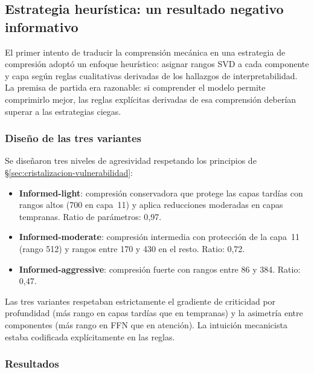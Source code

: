 \subsection{Estrategia heurística: un resultado negativo informativo}
\label{sec:informed-heuristic}

El primer intento de traducir la comprensión mecánica en una estrategia de
compresión adoptó un enfoque heurístico: asignar rangos SVD a cada
componente y capa según reglas cualitativas derivadas de los hallazgos de
interpretabilidad. La premisa de partida era razonable: si comprender el
modelo permite comprimirlo mejor, las reglas explícitas derivadas de esa
comprensión deberían superar a las estrategias ciegas.

\subsubsection{Diseño de las tres variantes}

Se diseñaron tres niveles de agresividad respetando los principios de
\S\ref{sec:cristalizacion-vulnerabilidad}:

\begin{itemize}[nosep]
    \item \textbf{Informed-light}: compresión conservadora que protege las
    capas tardías con rangos altos (700 en capa~11) y aplica reducciones
    moderadas en capas tempranas. Ratio de parámetros: 0{,}97.

    \item \textbf{Informed-moderate}: compresión intermedia con protección
    de la capa~11 (rango 512) y rangos entre 170 y 430 en el resto. Ratio:
    0{,}72.

    \item \textbf{Informed-aggressive}: compresión fuerte con rangos entre
    86 y 384. Ratio: 0{,}47.
\end{itemize}

Las tres variantes respetaban estrictamente el gradiente de criticidad por
profundidad (más rango en capas tardías que en tempranas) y la asimetría
entre componentes (más rango en FFN que en atención). La intuición
mecanicista estaba codificada explícitamente en las reglas.

\subsubsection{Resultados}

